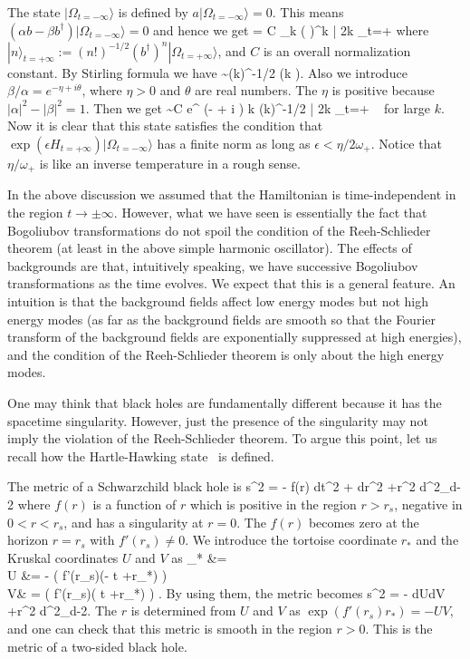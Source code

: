 \documentclass[a4paper,11pt]{article}
\theoremstyle{plain}
\theoremstyle{definition}
\numberwithin{thm}{section}
\newcommand{\ket}[1]{ | {#1} \rangle }
\def\beq#1\eeq{\begin{align}#1\end{align}}
\begin{document}
The state $\ket{\Omega_{t=-\infty}}$ is defined by
$
a \ket{\Omega_{t=-\infty}} =0.
$
This means $(\alpha b - \beta b^\dagger) \ket{\Omega_{t=-\infty}} =0$ and hence we get
\beq
\ket{\Omega_{t=-\infty}} = C \sum_{k }\left( \frac{\beta}{\alpha} \right)^k  \cdot \ket{2k}_{t=+\infty} \label{eq:transf}
\eeq
where 
$
\ket{n}_{t=+\infty}:=  (n!)^{-1/2} (b^\dagger)^{n}\ket{\Omega_{t=+\infty}} 
$, and 
$C$ is an overall normalization constant. 
By Stirling formula we have
\beq
\sqrt{\frac{(2k)!}{2^{2k}(k!)^2}}  \sim  (\pi k)^{-1/2} \qquad (k ).
\eeq
Also we introduce
$
\beta / \alpha= e^{- \eta + i \theta} 
$,
where $\eta>0$ and $\theta$ are real numbers. The $\eta$ is positive because $|\alpha|^2 - |\beta|^2=1$.
Then we get
\beq
\ket{\Omega_{t=-\infty}} \sim C \sum  e^{ (- \eta  + i \theta) k}  (\pi k)^{-1/2} \ket{2k}_{t=+\infty} \
\eeq
for large $k$. Now it is clear that this state satisfies the condition that $\exp( \epsilon H_{t=+\infty} ) \ket{\Omega_{t=-\infty}}$
has a finite norm as long as $\epsilon < \eta/2\omega_+$. Notice that $\eta/\omega_+$ is like an inverse temperature in a rough sense.

In the above discussion we assumed that the Hamiltonian is time-independent in the region $t \to \pm \infty$.
However, what we have seen is essentially the fact that Bogoliubov transformations do not spoil the condition of the Reeh-Schlieder theorem
(at least in the above simple harmonic oscillator). The effects of backgrounds are that, intuitively speaking, we have successive Bogoliubov transformations
as the time evolves.
We expect that this is a general feature. An intuition is that the background fields affect low energy modes but not high energy modes
(as far as the background fields are smooth so that the Fourier transform of the background fields are exponentially suppressed at high energies), and
the condition of the Reeh-Schlieder theorem is only about the high energy modes.

One may think that black holes are fundamentally different because it has the spacetime singularity.
However, just the presence of the singularity may not imply the violation of the Reeh-Schlieder theorem.
To argue this point, let us recall how the Hartle-Hawking state~\cite{Hartle:1976tp} is defined.

The metric of a Schwarzchild black hole is 
\beq
ds^2 = - f(r) dt^2 +  dr^2 +r^2 d\Omega^2_{d-2}
\eeq
where $f(r)$ is a function of $r$ which is positive in the region $r>r_s$, negative in $0<r<r_s$, and has a singularity at $r=0$.
The $f(r)$ becomes zero at the horizon $r=r_s$ with $f'(r_s) \neq 0$.
We introduce the tortoise coordinate $r_*$ and the Kruskal coordinates $U$ and $V$ as
\beq
r_* &=  \int {}  \\
U &= - \exp \left(   f'(r_s)(- t +r_*) \right) \\
V&  =  \exp \left( \frac{1}{2} f'(r_s)( t +r_*) \right) .
\eeq
By using them, the metric becomes
\beq
ds^2 = -  dUdV +r^2 d\Omega^2_{d-2}.
\eeq
The $r$ is determined from $U$ and $V$ as $\exp(f'(r_s)r_*)=-UV$, and one can check that this metric is smooth in the region $r>0$.
This is the metric of a two-sided black hole.
\end{document}
